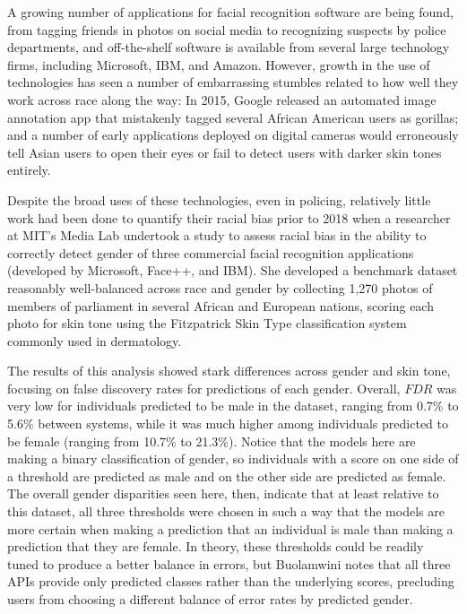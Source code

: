 \documentclass[]{krantz}
\begin{document}
A growing number of applications for facial recognition software are
being found, from tagging friends in photos on social media to
recognizing suspects by police departments, and off-the-shelf software
is available from several large technology firms, including Microsoft,
IBM, and Amazon. However, growth in the use of technologies has seen a
number of embarrassing stumbles related to how well they work across
race along the way: In 2015, Google released an automated image
annotation app that mistakenly tagged several African American users as
gorillas; and a number of early applications deployed on digital cameras
would erroneously tell Asian users to open their eyes or fail to detect
users with darker skin tones entirely.

Despite the broad uses of these technologies, even in policing,
relatively little work had been done to quantify their racial bias prior
to 2018 when a researcher at MIT's Media Lab undertook a study to assess
racial bias in the ability to correctly detect gender of three
commercial facial recognition applications (developed by Microsoft,
Face++, and IBM). She developed a benchmark dataset reasonably
well-balanced across race and gender by collecting 1,270 photos of
members of parliament in several African and European nations, scoring
each photo for skin tone using the Fitzpatrick Skin Type classification
system commonly used in dermatology.

The results of this analysis showed stark differences across gender and
skin tone, focusing on false discovery rates for predictions of each
gender. Overall, \(FDR\) was very low for individuals predicted to be
male in the dataset, ranging from 0.7\% to 5.6\% between systems, while
it was much higher among individuals predicted to be female (ranging
from 10.7\% to 21.3\%). Notice that the models here are making a binary
classification of gender, so individuals with a score on one side of a
threshold are predicted as male and on the other side are predicted as
female. The overall gender disparities seen here, then, indicate that at
least relative to this dataset, all three thresholds were chosen in such
a way that the models are more certain when making a prediction that an
individual is male than making a prediction that they are female. In
theory, these thresholds could be readily tuned to produce a better
balance in errors, but Buolamwini notes that all three APIs provide only
predicted classes rather than the underlying scores, precluding users
from choosing a different balance of error rates by predicted gender.
\end{document}
